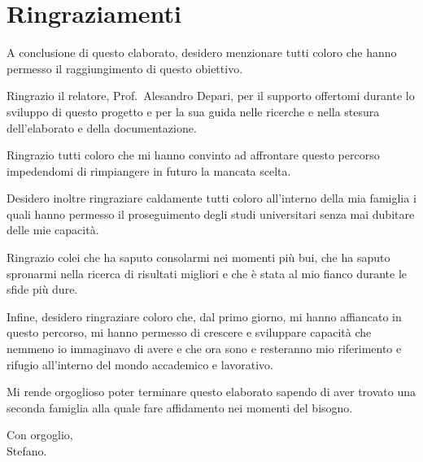 \chapter*{Ringraziamenti}

A conclusione di questo elaborato, desidero menzionare tutti coloro che hanno permesso il raggiungimento di questo obiettivo.

Ringrazio il relatore, Prof.\ Alesandro Depari, per il supporto offertomi durante lo sviluppo di questo progetto e per la sua guida nelle ricerche e nella stesura dell'elaborato e della documentazione.

Ringrazio tutti coloro che mi hanno convinto ad affrontare questo percorso impedendomi di rimpiangere in futuro la mancata scelta.

Desidero inoltre ringraziare caldamente tutti coloro all'interno della mia famiglia i quali hanno permesso il proseguimento degli studi universitari senza mai dubitare delle mie capacità.

Ringrazio colei che ha saputo consolarmi nei momenti più bui, che ha saputo spronarmi nella ricerca di risultati migliori e che è stata al mio fianco durante le sfide più dure.

Infine, desidero ringraziare coloro che, dal primo giorno, mi hanno affiancato in questo percorso, mi hanno permesso di crescere e sviluppare capacità che nemmeno io immaginavo di avere e che ora sono e resteranno mio riferimento e rifugio all'interno del mondo accademico e lavorativo.

Mi rende orgoglioso poter terminare questo elaborato sapendo di aver trovato una seconda famiglia alla quale fare affidamento nei momenti del bisogno.

\vfill

{\setlength{\parindent}{0cm}
Con orgoglio,\\
Stefano.
}